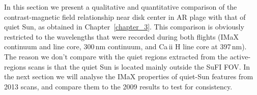 \documentclass[goettingen, gauss, print]{thesis}
\begin{document}
In this section we present a qualitative and quantitative comparison of the contrast-magnetic field relationship near disk center in AR plage with that of quiet Sun, as obtained in Chapter~\ref{chapter_3}. This comparison is obviously restricted to the wavelengths that were recorded during both flights (IMaX continuum and line core, 300\,nm continuum, and Ca\,{\sc ii} H line core at 397\,nm). The reason we don't compare with the quiet regions extracted from the active-regions scans is that the quiet Sun is located mainly outside the SuFI FOV. In the next section we will analyse the IMaX properties of quiet-Sun features from 2013 scans, and compare them to the 2009 results to test for consistency. 






\end{document}
